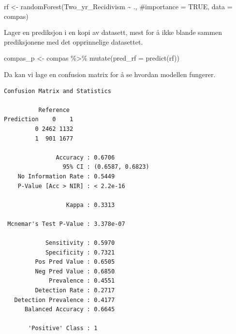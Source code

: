 \documentclass[
  letterpaper,
  DIV=11,
  numbers=noendperiod]{scrreprt}
\newenvironment{Shaded}{\begin{snugshade}}{\end{snugshade}}
\newcommand{\AttributeTok}[1]{\textcolor[rgb]{0.40,0.45,0.13}{#1}}
\newcommand{\CommentTok}[1]{\textcolor[rgb]{0.37,0.37,0.37}{#1}}
\newcommand{\FunctionTok}[1]{\textcolor[rgb]{0.28,0.35,0.67}{#1}}
\newcommand{\NormalTok}[1]{\textcolor[rgb]{0.00,0.23,0.31}{#1}}
\newcommand{\OtherTok}[1]{\textcolor[rgb]{0.00,0.23,0.31}{#1}}
\newcommand{\SpecialCharTok}[1]{\textcolor[rgb]{0.37,0.37,0.37}{#1}}
\newcommand{\StringTok}[1]{\textcolor[rgb]{0.13,0.47,0.30}{#1}}
\begin{document}
\begin{Shaded}
\begin{Highlighting}[]
\NormalTok{rf }\OtherTok{\textless{}{-}} \FunctionTok{randomForest}\NormalTok{(Two\_yr\_Recidivism }\SpecialCharTok{\textasciitilde{}}\NormalTok{ .,}
                   \CommentTok{\#importance = TRUE,}
                    \AttributeTok{data =}\NormalTok{ compas)}
\end{Highlighting}
\end{Shaded}

Lager en prediksjon i en kopi av datasett, mest for å ikke blande sammen
prediksjonene med det opprinnelige datasettet.

\begin{Shaded}
\begin{Highlighting}[]
\NormalTok{compas\_p }\OtherTok{\textless{}{-}}\NormalTok{ compas }\SpecialCharTok{\%\textgreater{}\%} 
  \FunctionTok{mutate}\NormalTok{(}\AttributeTok{pred\_rf =} \FunctionTok{predict}\NormalTok{(rf))  }
\end{Highlighting}
\end{Shaded}

Da kan vi lage en confusion matrix for å se hvordan modellen fungerer.

\begin{Shaded}
\end{Shaded}

\begin{verbatim}
Confusion Matrix and Statistics

          Reference
Prediction    0    1
         0 2462 1132
         1  901 1677
                                          
               Accuracy : 0.6706          
                 95% CI : (0.6587, 0.6823)
    No Information Rate : 0.5449          
    P-Value [Acc > NIR] : < 2.2e-16       
                                          
                  Kappa : 0.3313          
                                          
 Mcnemar's Test P-Value : 3.378e-07       
                                          
            Sensitivity : 0.5970          
            Specificity : 0.7321          
         Pos Pred Value : 0.6505          
         Neg Pred Value : 0.6850          
             Prevalence : 0.4551          
         Detection Rate : 0.2717          
   Detection Prevalence : 0.4177          
      Balanced Accuracy : 0.6645          
                                          
       'Positive' Class : 1               
                                          
\end{verbatim}
\end{document}
